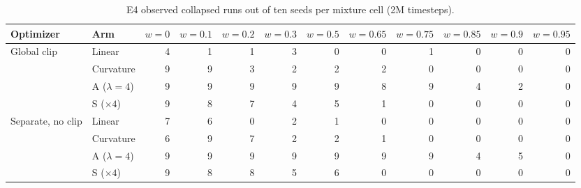 \begin{table}[H]
\caption{E4 observed collapsed runs out of ten seeds per mixture cell (2M timesteps).}
\label{tab:lbf_cells}
\centering\scriptsize
\begin{tabular}{@{}llrrrrrrrrrr@{}}
\toprule
Optimizer & Arm & $w{=}0$ & $w{=}0.1$ & $w{=}0.2$ & $w{=}0.3$ & $w{=}0.5$ & $w{=}0.65$ & $w{=}0.75$ & $w{=}0.85$ & $w{=}0.9$ & $w{=}0.95$ \\
\midrule
Global clip & Linear & 4 & 1 & 1 & 3 & 0 & 0 & 1 & 0 & 0 & 0 \\
 & Curvature & 9 & 9 & 3 & 2 & 2 & 2 & 0 & 0 & 0 & 0 \\
 & A ($\lambda{=}4$) & 9 & 9 & 9 & 9 & 9 & 8 & 9 & 4 & 2 & 0 \\
 & S ($\times4$) & 9 & 8 & 7 & 4 & 5 & 1 & 0 & 0 & 0 & 0 \\
Separate, no clip & Linear & 7 & 6 & 0 & 2 & 1 & 0 & 0 & 0 & 0 & 0 \\
 & Curvature & 6 & 9 & 7 & 2 & 2 & 1 & 0 & 0 & 0 & 0 \\
 & A ($\lambda{=}4$) & 9 & 9 & 9 & 9 & 9 & 9 & 9 & 4 & 5 & 0 \\
 & S ($\times4$) & 9 & 8 & 8 & 5 & 6 & 0 & 0 & 0 & 0 & 0 \\
\bottomrule
\end{tabular}
\end{table}
